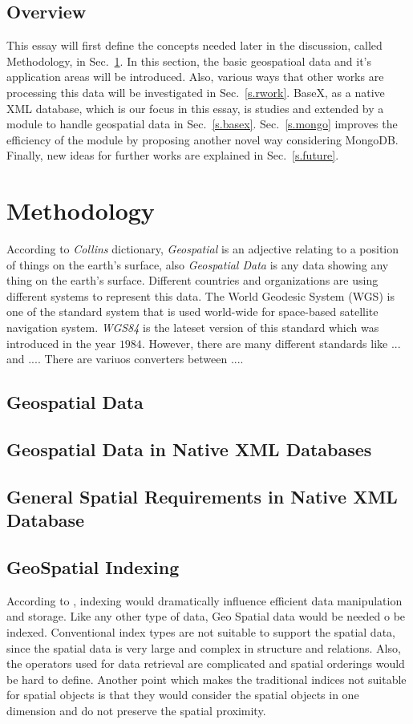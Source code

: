 \documentclass[a4paper,12pt]{article}
\begin{document}
\subsection{Overview}
This essay will first define the concepts needed later in the discussion, called
Methodology, in Sec.~\ref{s.method}. In this section, the basic geospatioal data
and it's application areas will be introduced. Also, various ways that other works
are processing this data will be investigated in Sec.~\ref{s.rwork}. BaseX,
as a native XML database, which is our focus in this essay, is studies and extended
by a module to handle geospatial data in Sec.~\ref{s.basex}. 
Sec.~\ref{s.mongo} improves the efficiency of the module
by proposing another novel way considering MongoDB.
Finally, new ideas for further works are explained in
Sec.~\ref{s.future}.


\newpage
\section{Methodology}
\label{s.method}
According to \emph{Collins} dictionary, \emph{Geospatial} is an adjective relating to a position of things on the
earth's surface, also \emph{Geospatial Data}  is any data showing any thing on the earth's surface. Different 
countries and organizations are using different systems to represent this data. 
The World Geodesic System (WGS) is one of the standard system that is used world-wide 
for space-based satellite navigation system. \emph{WGS84} is the lateset version of this standard which
was introduced in the year $1984$. However, there are many different standards like ... and .... 
There are variuos converters between ....

\subsection{Geospatial Data}

\subsection{Geospatial Data in Native XML Databases}

\subsection{General Spatial Requirements in Native XML Database}

\subsection{GeoSpatial Indexing}
According to \cite{survey}, indexing would dramatically influence efficient data manipulation and storage. Like any other type of data, Geo Spatial data would be needed o be indexed. Conventional index types are not suitable to support the spatial data, since the spatial data is very large and complex in structure and relations. Also, the operators used for data retrieval are complicated and spatial orderings would be hard to define. Another point which makes the traditional indices not suitable for spatial objects is that they would consider the spatial objects in one dimension and do not preserve the spatial proximity.
\end{document}
